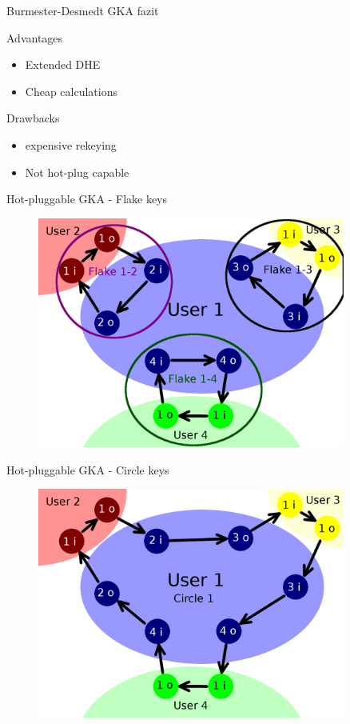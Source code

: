 \begin{frame}{Burmester-Desmedt GKA fazit}
	\begin{block}{Advantages}
		\begin{itemize}
			\item Extended DHE
			\item Cheap calculations
		\end{itemize}
	\end{block}
	\begin{alertblock}{Drawbacks}
		\begin{itemize}
			\item expensive rekeying
			\item Not hot-plug capable
		\end{itemize}
	\end{alertblock}
\end{frame}

\begin{frame}{Hot-pluggable GKA - Flake keys}
	\begin{figure}
		\centering
		\includegraphics[width = 0.9\textwidth]{./abbildungen/flake.png}
	\end{figure}
\end{frame}

\begin{frame}{Hot-pluggable GKA - Circle keys}
	\begin{figure}
		\centering
		\includegraphics[width = 0.9\textwidth]{./abbildungen/circle.png}
	\end{figure}
\end{frame}
